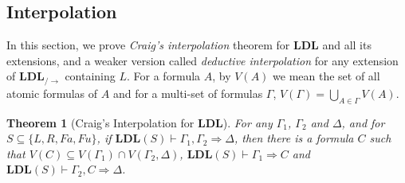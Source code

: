 \documentclass[12pt,a4paper]{article}
\theoremstyle{plain}
\newtheorem{thm}{Theorem}[section]
\theoremstyle{definition}
\begin{document}
\subsection{Interpolation}
In this section, we prove \emph{Craig's interpolation} theorem for $\mathbf{LDL}$ and all its extensions, and a weaker version called \emph{deductive interpolation} for any extension of $\mathbf{LDL}_{/\rightarrow}$ containing $L$. For a formula $A$, by $V(A)$ we mean the set of all atomic formulas of $A$ and for a multi-set of formulas $\Gamma$, $V(\Gamma) = \bigcup_{A \in \Gamma} V(A)$.
\begin{thm}[Craig's Interpolation for $\mathbf{LDL}$]\label{thm:ldl-craig} For any $\Gamma_1$, $\Gamma_2$ and $\Delta$, and for $S \subseteq \{L, R, Fa, Fu\}$, if $\mathbf{LDL}(S) \vdash \Gamma_1 , \Gamma_2 \Rightarrow \Delta$, then there is a formula $C$ such that $V(C) \subseteq V(\Gamma_1) \cap V(\Gamma_2 , \Delta)$, $\mathbf{LDL}(S) \vdash \Gamma_1 \Rightarrow C$ and $\mathbf{LDL}(S) \vdash \Gamma_2 , C \Rightarrow \Delta$.
\end{thm}
\end{document}
